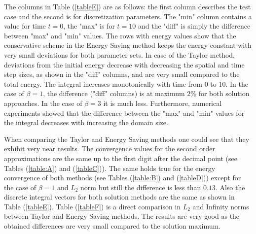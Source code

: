 \documentclass{article}
\newcommand{\rf}[1]{(\ref{#1})}
\begin{document}
The columns in Table \rf{tableE} are as follows: the first column describes the test case and the second is for discretization parameters.
The "min" column contains a value for time $t=0$, the "max" is for $t=10$ and the "diff" is simply the difference between "max" and "min" values. The rows with energy values show that the conservative scheme in the Energy Saving method keeps the energy constant with very small deviations for both parameter sets. In case of the Taylor method, deviations from the initial energy decrease with decreasing the spatial and time step sizes, as shown in the "diff" columns, and are very small compared to the total energy. The integral increases monotonically with time from 0 to 10. In the case of $\beta = 1$, the difference ("diff" columns) is at maximum $2\%$ for both solution approaches. In the case of $\beta = 3$ it is much less. Furthermore, numerical experiments showed that the difference between the "max" and "min" values for the integral decreases with increasing the domain size.

When comparing the Taylor and Energy Saving methods one could see that they exhibit very near results. The convergence values for the second order approximations are the same up to the first digit after the decimal point (see Tables \rf{table:A} and  \rf{tableC}). The same holds true for the energy convergence of both methods (see Tables \rf{table:B} and  \rf{tableD}) except for the case of $\beta = 1$ and $L_2$ norm but still the difference is less than $0.13$. Also the discrete integral vectors for both solution methods are the same as shown in Table \rf{tableE}. Table \rf{tableF} is a direct comparison in $L_2$ and Infinity norms between Taylor and Energy Saving methods. The results are very good as the obtained differences are very small compared to the solution maximum.
\end{document}
